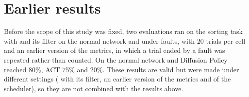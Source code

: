 \section{Earlier results}

Before the scope of this study was fixed, two evaluations ran on the sorting task with \drtc{} and its filter on the
normal network and under faults, with 20 trials per cell and an earlier version of the metrics, in which a trial ended
by a fault was repeated rather than counted. On the normal network \smolvla{} and Diffusion Policy reached 80\%, ACT
75\% and \groot{} 20\%. These results are valid but were made under different settings (\drtc{} with its filter, an
earlier version of the metrics and of the scheduler), so they are not combined with the results above.
